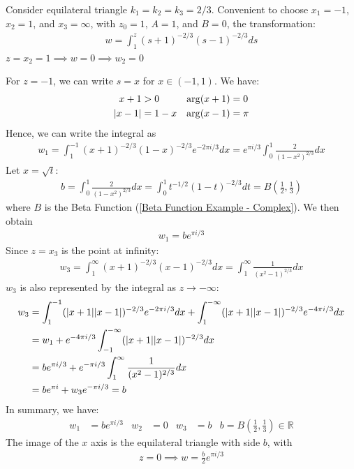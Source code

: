 \documentclass[12pt, english]{book}
\begin{document}
	\begin{example}
		Consider equilateral triangle \(k_1 = k_2 = k_3 = 2/3\). Convenient to choose \(x_1 = -1\), \(x_2 = 1\), and \(x_3 = \infty\), with \(z_0 = 1\), \(A = 1\), and \(B=0\), the transformation:
		\begin{align*}
			w = \int_{1}^{z} (s+1)^{-2/3} (s-1)^{-2/3} ds
		\end{align*}
		\(z = x_2 = 1 \implies w = 0 \implies w_2 = 0\)
		
		For \(z = -1\), we can write \(s = x\) for \(x \in (-1, 1)\). We have:
		\begin{align*}
			x + 1 &> 0 & \arg(x + 1) &= 0 \\
			\abs{x-1} &= 1-x & \arg(x - 1) &= \pi
		\end{align*}
		Hence, we can write the integral as
		\begin{align*}
			w_1 = \int_{1}^{-1} (x+1)^{-2/3} (1-x)^{-2/3} e^{-2\pi i/3} dx = e^{\pi i/3} \int_{0}^{1} \frac{2}{(1-x^2)^{2/3}} dx
		\end{align*}
		Let \(x = \sqrt{t}\):
		\begin{align*}
			b 
			= \int_{0}^{1} \frac{2}{(1-x^2)^{2/3}} dx 
			= \int_{0}^{1} t^{-1/2} (1-t)^{-2/3} dt
			= B \left(\frac{1}{2}, \frac{1}{3}\right)
		\end{align*}
		where \(B\) is the Beta Function (\cref{Beta Function Example - Complex}). We then obtain 
		\begin{align*}
			w_1 = b e^{\pi i/3}
		\end{align*}
		Since \(z = x_3\) is the point at infinity:
		\begin{align*}
			w_3 
			= \int_{1}^{\infty} (x+1)^{-2/3} (x-1)^{-2/3} dx 
			= \int_{1}^{\infty} \frac{1}{(x^2 - 1)^{2/3}} dx
		\end{align*}
		\(w_3\) is also represented by the integral as \(z \rightarrow -\infty\):
		\begin{align*}
			w_3 
			&= \int_{1}^{-1} (\abs{x+1} \abs{x-1})^{-2/3} e^{-2\pi i/3} dx 
			 + \int_{1}^{-\infty} (\abs{x+1} \abs{x-1})^{-2/3} e^{-4\pi i/3} dx \\
			&= w_1 + e^{-4\pi i/3} \int_{-1}^{-\infty} (\abs{x+1} \abs{x-1})^{-2/3} dx \\
			&= b e^{\pi i/3} + e^{-\pi i/3} \int_{1}^{\infty} \frac{1}{(x^2 - 1)^{2/3}} dx \\
			&= be^{\pi i} + w_3 e^{-\pi i/3} = b
		\end{align*}
		In summary, we have:
		\begin{align*}
			w_1 &= b e^{\pi i/3} & 
			w_2 &= 0 &
			w_3 &= b & b = B\left(\frac{1}{2}, \frac{1}{3}\right) \in \mathbb{R}
		\end{align*}
		The image of the \(x\) axis is the equilateral triangle with side \(b\), with 
		\begin{align*}
			z = 0 \implies w = \frac{b}{2} e^{\pi i/3}
		\end{align*}
	\end{example}
\end{document}
